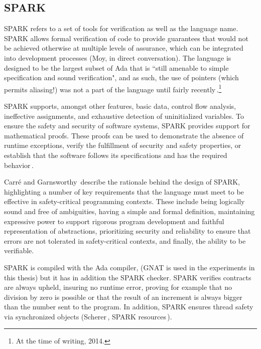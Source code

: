 \documentclass[nomenclature, english, bibtex]{kththesis}
\begin{document}
\subsection{SPARK}


SPARK refers to a set of tools for verification as well as the language name.
SPARK allows formal verification of code to provide guarantees that would not be achieved otherwise at multiple levels of assurance, which can be integrated into development processes (Moy, in direct conversation). The language is designed to be the largest subset of Ada that is ``still amenable to simple specification and sound verification", and as such, the use of pointers (which permits aliasing!) was not a part of the language until fairly recently\,\cite{jaloyan_safe_2017, dross_using_2019}.\footnote{At the time of writing, 2014.}

 SPARK supports, amongst other features, basic data, control flow analysis, ineffective assignments, and exhaustive detection of uninitialized variables. To ensure the safety and security of software systems, SPARK provides support for mathematical proofs. These proofs can be used to demonstrate the absence of runtime exceptions, verify the fulfillment of security and safety properties, or establish that the software follows its specifications and has the required behavior\,\cite{noauthor_spark_nodate}.
 
Carré and Garnsworthy\,\cite{carre_spark_1990} describe the rationale behind the design of SPARK, highlighting a number of key requirements that the language must meet to be effective in safety-critical programming contexts. These include being logically sound and free of ambiguities, having a simple and formal definition, maintaining expressive power to support rigorous program development and faithful representation of abstractions, prioritizing security and reliability to ensure that errors are not tolerated in safety-critical contexts, and finally, the ability to be verifiable.

SPARK is compiled with the Ada compiler, (GNAT is used in the experiments in this thesis) but it has in addition the SPARK checker. SPARK verifies contracts are always upheld, insuring no runtime error, proving for example that no division by zero is possible or that the result of an increment is always bigger than the number sent to the program. In addition, SPARK ensures thread safety via synchronized objects (Scherer\,\cite{scherer_engineering_2021}, SPARK resources\,\cite{noauthor_spark_nodate}).
\end{document}

